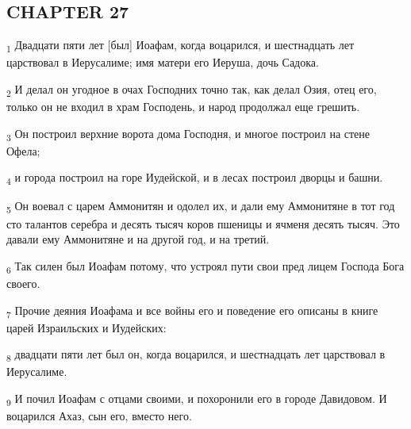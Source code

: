 \subsection{CHAPTER 27}
\begin{tcolorbox}
\textsubscript{1} Двадцати пяти лет [был] Иоафам, когда воцарился, и шестнадцать лет царствовал в Иерусалиме; имя матери его Иеруша, дочь Садока.
\end{tcolorbox}
\begin{tcolorbox}
\textsubscript{2} И делал он угодное в очах Господних точно так, как делал Озия, отец его, только он не входил в храм Господень, и народ продолжал еще грешить.
\end{tcolorbox}
\begin{tcolorbox}
\textsubscript{3} Он построил верхние ворота дома Господня, и многое построил на стене Офела;
\end{tcolorbox}
\begin{tcolorbox}
\textsubscript{4} и города построил на горе Иудейской, и в лесах построил дворцы и башни.
\end{tcolorbox}
\begin{tcolorbox}
\textsubscript{5} Он воевал с царем Аммонитян и одолел их, и дали ему Аммонитяне в тот год сто талантов серебра и десять тысяч коров пшеницы и ячменя десять тысяч. Это давали ему Аммонитяне и на другой год, и на третий.
\end{tcolorbox}
\begin{tcolorbox}
\textsubscript{6} Так силен был Иоафам потому, что устроял пути свои пред лицем Господа Бога своего.
\end{tcolorbox}
\begin{tcolorbox}
\textsubscript{7} Прочие деяния Иоафама и все войны его и поведение его описаны в книге царей Израильских и Иудейских:
\end{tcolorbox}
\begin{tcolorbox}
\textsubscript{8} двадцати пяти лет был он, когда воцарился, и шестнадцать лет царствовал в Иерусалиме.
\end{tcolorbox}
\begin{tcolorbox}
\textsubscript{9} И почил Иоафам с отцами своими, и похоронили его в городе Давидовом. И воцарился Ахаз, сын его, вместо него.
\end{tcolorbox}
